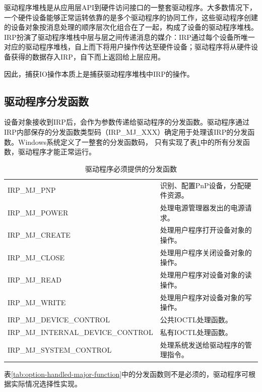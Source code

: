 驱动程序堆栈是从应用层API到硬件访问接口的一整套驱动程序。大多数情况下，一个硬件设备能够正常运转依靠的是多个驱动程序的协同工作，这些驱动程序创建的设备对象按消息处理的顺序层次化组合在了一起，构成了设备的驱动程序堆栈。IRP扮演了驱动程序堆栈中层与层之间传递消息的媒介：IRP通过每个设备所唯一对应的驱动程序堆栈，自上而下将用户操作传达至硬件设备；驱动程序将从硬件设备获得的数据存入IRP，自下而上返回给上层应用。

因此，捕获IO操作本质上是捕获驱动程序堆栈中IRP的操作。

\subsection{驱动程序分发函数}
设备对象接收到IRP后，会作为参数传递给驱动程序的分发函数。驱动程序通过IRP内部保存的分发函数类型码（IRP\_MJ\_XXX）确定用于处理该IRP的分发函数。Windows系统定义了一整套的分发函数码，
只有实现了表\ref{tab:must-handled-major-function}中的所有分发函数，驱动程序才能正常运行。

\begin{table}[H]
\centering
\caption{驱动程序必须提供的分发函数}
\begin{tabular}{|ll|}
\hline IRP\_MJ\_PNP  & 识别、配置PnP设备，分配硬件资源。 \\
       IRP\_MJ\_POWER & 处理电源管理器发出的电源请求。 \\
       IRP\_MJ\_CREATE & 处理用户程序打开设备对象的操作。 \\
       IRP\_MJ\_CLOSE & 处理用户程序关闭设备对象的操作。 \\
       IRP\_MJ\_READ & 处理用户程序对设备对象的读操作。 \\
       IRP\_MJ\_WRITE & 处理用户程序对设备对象的写操作。 \\
       IRP\_MJ\_DEVICE\_CONTROL & 公共IOCTL处理函数。 \\
       IRP\_MJ\_INTERNAL\_DEVICE\_CONTROL & 私有IOCTL处理函数。 \\
       IRP\_MJ\_SYSTEM\_CONTROL & 处理系统发送给驱动程序的管理指令。 \\
\hline
\end{tabular}
\label{tab:must-handled-major-function}
\end{table}

表\ref{tab:option-handled-major-function}中的分发函数则不是必须的，驱动程序可根据实际情况选择性实现。

